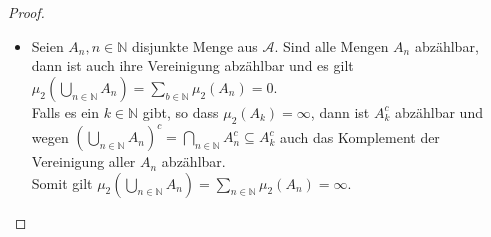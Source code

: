 \documentclass[11pt]{amsart}
\begin{document}
\begin{proof}
\begin{itemize}
\item Seien $A_n, n \in \mathbb{N}$ disjunkte Menge aus $\mathcal{A}$. Sind alle Mengen $A_n$ abzählbar, dann ist auch ihre Vereinigung abzählbar und es gilt $\mu_2(\bigcup_{n \in \mathbb{N}} A_n) = \sum_{b \in \mathbb{N}} \mu_2(A_n) = 0$. \\
Falls es ein $k \in \mathbb{N}$ gibt, so dass $\mu_2(A_k) = \infty$, dann ist $A_k^c$ abzählbar und wegen $(\bigcup_{n \in \mathbb{N}} A_n)^c = \bigcap_{n \in \mathbb{N}} A_n^c \subseteq A_k^c$ auch das Komplement der Vereinigung aller $A_n$ abzählbar. \\
Somit gilt $\mu_2(\bigcup_{n \in \mathbb{N}} A_n) = \sum_{n \in \mathbb{N}} \mu_2(A_n) = \infty$.
\end{itemize}




\end{proof}
\end{document}
